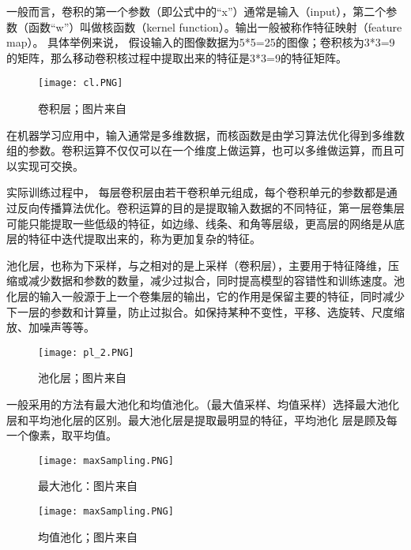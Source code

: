 一般而言，卷积的第一个参数（即公式中的“x”）通常是输入（input），第二个参数（函数“w”）叫做核函数（kernel function）。输出一般被称作特征映射（feature map）。
具体举例来说，
假设输入的图像数据为5*5=25的图像；卷积核为3*3=9的矩阵，那么移动卷积核过程中提取出来的特征是3*3=9的特征矩阵。
\begin{figure}[htbp]
\begin{center}
\texttt{[image: cl.PNG]}
\caption{卷积层；图片来自\cite{Robinson2018}}
\label{fig3-CL}
\end{center}
\end{figure}

在机器学习应用中，输入通常是多维数据，而核函数是由学习算法优化得到多维数组的参数。卷积运算不仅仅可以在一个维度上做运算，也可以多维做运算，而且可以实现可交换。

实际训练过程中，
每层卷积层由若干卷积单元组成，每个卷积单元的参数都是通过反向传播算法优化。卷积运算的目的是提取输入数据的不同特征，第一层卷集层可能只能提取一些低级的特征，如边缘、线条、和角等层级，更高层的网络是从底层的特征中迭代提取出来的，称为更加复杂的特征。

池化层，也称为下采样，与之相对的是上采样（卷积层），主要用于特征降维，压缩或减少数据和参数的数量，减少过拟合，同时提高模型的容错性和训练速度。池化层的输入一般源于上一个卷集层的输出，它的作用是保留主要的特征，同时减少下一层的参数和计算量，防止过拟合。如保持某种不变性，平移、选旋转、尺度缩放、加噪声等等。

 \begin{figure}[htbp]
\begin{center}
\texttt{[image: pl\_2.PNG]}
\caption{池化层；图片来自\cite{Robinson2018}}
\label{fig3-PL}
\end{center}
\end{figure}
一般采用的方法有最大池化和均值池化。（最大值采样、均值采样）选择最大池化层和平均池化层的区别。最大池化层是提取最明显的特征，平均池化 层是顾及每一个像素，取平均值。
 \begin{figure}[htbp]
\begin{center}
\texttt{[image: maxSampling.PNG]}
\caption{最大池化：图片来自\cite{Robinson2018}}
\label{fig3-MS}
\end{center}
\end{figure}
 \begin{figure}[htbp]
\begin{center}
\texttt{[image: maxSampling.PNG]}
\caption{均值池化；图片来自\cite{Robinson2018}}
\label{fig3-MaxS}
\end{center}
\end{figure}

